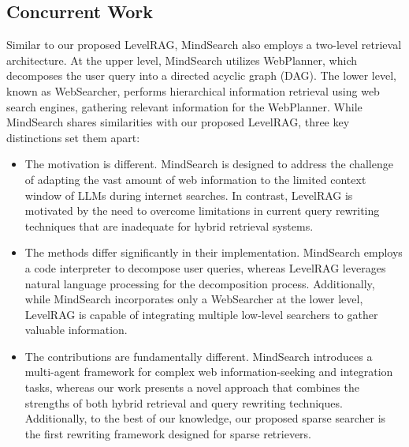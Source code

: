 \subsection{Concurrent Work}
Similar to our proposed LevelRAG, MindSearch \cite{mind_search} also employs a two-level retrieval architecture. At the upper level, MindSearch utilizes WebPlanner, which decomposes the user query into a directed acyclic graph (DAG). The lower level, known as WebSearcher, performs hierarchical information retrieval using web search engines, gathering relevant information for the WebPlanner. While MindSearch shares similarities with our proposed LevelRAG, three key distinctions set them apart:

\begin{itemize}
    \item The motivation is different. MindSearch is designed to address the challenge of adapting the vast amount of web information to the limited context window of LLMs during internet searches. In contrast, LevelRAG is motivated by the need to overcome limitations in current query rewriting techniques that are inadequate for hybrid retrieval systems.
    \item The methods differ significantly in their implementation. MindSearch employs a code interpreter to decompose user queries, whereas LevelRAG leverages natural language processing for the decomposition process. Additionally, while MindSearch incorporates only a WebSearcher at the lower level, LevelRAG is capable of integrating multiple low-level searchers to gather valuable information.
    \item The contributions are fundamentally different. MindSearch introduces a multi-agent framework for complex web information-seeking and integration tasks, whereas our work presents a novel approach that combines the strengths of both hybrid retrieval and query rewriting techniques. Additionally, to the best of our knowledge, our proposed sparse searcher is the first rewriting framework designed for sparse retrievers.
\end{itemize}